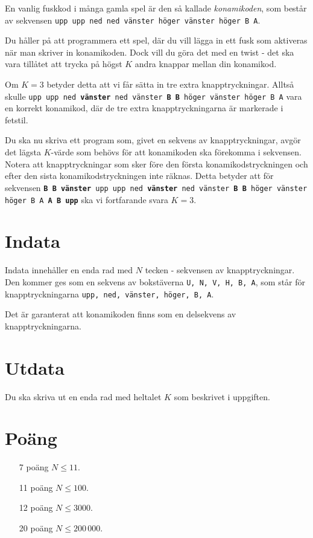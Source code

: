 
En vanlig fuskkod i många gamla spel är den så kallade \emph{konamikoden}, som består av sekvensen \texttt{upp upp ned ned vänster höger vänster höger B A}.

Du håller på att programmera ett spel, där du vill lägga in ett fusk som aktiveras när man skriver in konamikoden. Dock vill du göra det med en twist - det ska vara tillåtet att trycka på högst $K$ andra knappar mellan din konamikod.

Om $K = 3$ betyder detta att vi får sätta in tre extra knapptryckningar. Alltså skulle \texttt{upp upp ned \textbf{vänster} ned vänster \textbf{B B} höger vänster höger B A} vara en korrekt konamikod, där de tre extra knapptryckningarna är markerade i fetstil.

Du ska nu skriva ett program som, givet en sekvens av knapptryckningar, avgör det lägsta $K$-värde som behövs för att konamikoden ska förekomma i sekvensen. Notera att knapptryckningar som sker före den första konamikodstryckningen och efter den sista konamikodstryckningen inte räknas. Detta betyder att för sekvensen \texttt{\textbf{B B vänster} upp upp ned \textbf{vänster} ned vänster \textbf{B B} höger vänster höger B A \textbf{A B upp}} ska vi fortfarande svara $K = 3$.

\section*{Indata}
Indata innehåller en enda rad med $N$ tecken - sekvensen av knapptryckningar. Den kommer ges som en sekvens av bokstäverna \texttt{U, N, V, H, B, A}, som står för knapptryckningarna \texttt{upp, ned, vänster, höger, B, A}.

Det är garanterat att konamikoden finns som en delsekvens av knapptryckningarna.

\section*{Utdata}
Du ska skriva ut en enda rad med heltalet $K$ som beskrivet i uppgiften.

\section*{Poäng}

\begin{enumerate}
	\item[7 poäng] $N \le 11$.
	\item[11 poäng] $N \le 100$.
	\item[12 poäng] $N \le 3000$.
	\item[20 poäng] $N \le 200\,000$.
\end{enumerate}
